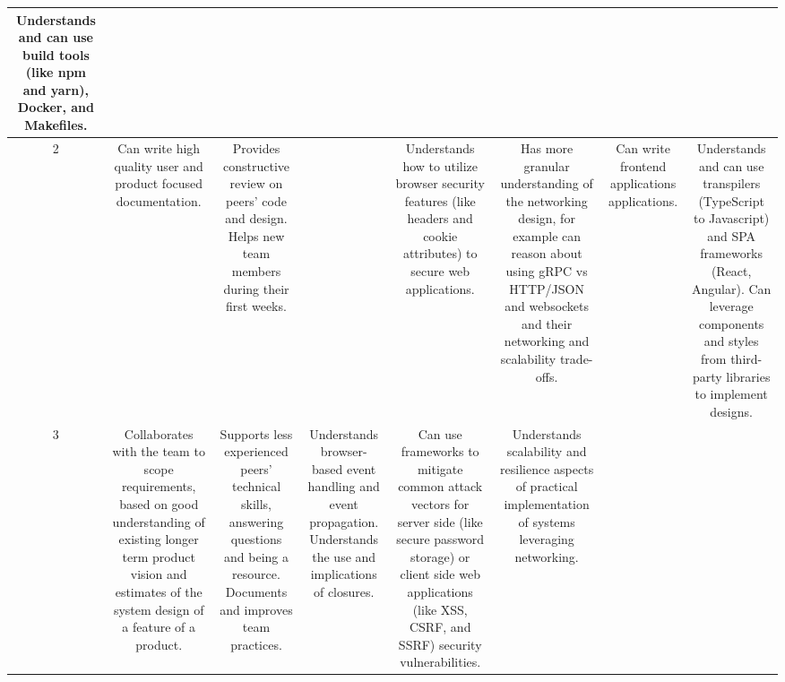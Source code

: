 \documentclass{article}
\begin{document}
{\begin{center}
\begin{tabular}{|C|C|C|C|C|C|C|C|}
    Understands and can use build tools (like npm and yarn), Docker, and
    Makefiles.
    \\ [13em]
  \hline
    2
    &

    Can write high quality user and product focused documentation.
    &

    Provides constructive review on peers' code and design. Helps new team
    members during their first weeks.
    &

    &

    Understands how to utilize browser security features (like headers and
    cookie attributes) to secure web applications.
    &

    Has more granular understanding of the networking design, for example can
    reason about using gRPC vs HTTP/JSON and websockets and their networking
    and scalability trade-offs.
    &

    Can write frontend applications applications.
    &

    Understands and can use transpilers (TypeScript to Javascript) and SPA
    frameworks (React, Angular). Can leverage components and styles from
    third-party libraries to implement designs.
    \\ [13em]
  \hline
    3
    &

    Collaborates with the team to scope requirements, based on good
    understanding of existing longer term product vision and estimates of the
    system design of a feature of a product.
    &

    Supports less experienced peers' technical skills, answering questions and
    being a resource. Documents and improves team practices.
    &

    Understands browser-based event handling and event propagation.
    Understands the use and implications of closures.
    &

    Can use frameworks to mitigate common attack vectors for server side (like
    secure password storage) or client side web applications (like XSS, CSRF, and
    SSRF) security vulnerabilities.
    &

    Understands scalability and resilience aspects of practical implementation
    of systems leveraging networking.


\end{tabular}
\end{center}}
\end{document}
